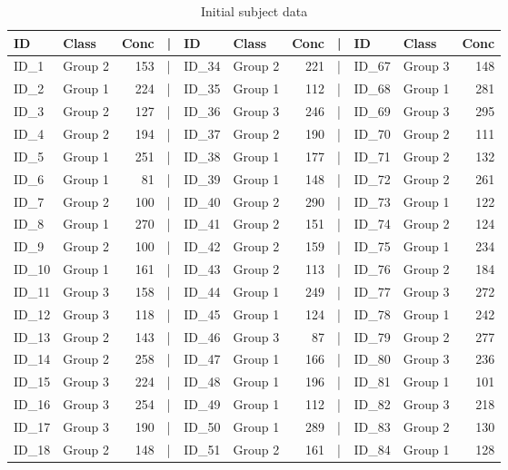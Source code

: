 \documentclass[smallextended]{svjour3}       %
\begin{document}
\newpage

\begin{table}

\caption{\label{tab:show-table-1}Initial subject data}
\centering
\begin{tabular}[t]{llrlllrlllr}
\toprule
ID & Class & Conc & | & ID & Class & Conc & | & ID & Class & Conc\\
\midrule
ID\_1 & Group 2 & 153 & | & ID\_34 & Group 2 & 221 & | & ID\_67 & Group 3 & 148\\
ID\_2 & Group 1 & 224 & | & ID\_35 & Group 1 & 112 & | & ID\_68 & Group 1 & 281\\
ID\_3 & Group 2 & 127 & | & ID\_36 & Group 3 & 246 & | & ID\_69 & Group 3 & 295\\
ID\_4 & Group 2 & 194 & | & ID\_37 & Group 2 & 190 & | & ID\_70 & Group 2 & 111\\
ID\_5 & Group 1 & 251 & | & ID\_38 & Group 1 & 177 & | & ID\_71 & Group 2 & 132\\
\addlinespace
ID\_6 & Group 1 & 81 & | & ID\_39 & Group 1 & 148 & | & ID\_72 & Group 2 & 261\\
ID\_7 & Group 2 & 100 & | & ID\_40 & Group 2 & 290 & | & ID\_73 & Group 1 & 122\\
ID\_8 & Group 1 & 270 & | & ID\_41 & Group 2 & 151 & | & ID\_74 & Group 2 & 124\\
ID\_9 & Group 2 & 100 & | & ID\_42 & Group 2 & 159 & | & ID\_75 & Group 1 & 234\\
ID\_10 & Group 1 & 161 & | & ID\_43 & Group 2 & 113 & | & ID\_76 & Group 2 & 184\\
\addlinespace
ID\_11 & Group 3 & 158 & | & ID\_44 & Group 1 & 249 & | & ID\_77 & Group 3 & 272\\
ID\_12 & Group 3 & 118 & | & ID\_45 & Group 1 & 124 & | & ID\_78 & Group 1 & 242\\
ID\_13 & Group 2 & 143 & | & ID\_46 & Group 3 & 87 & | & ID\_79 & Group 2 & 277\\
ID\_14 & Group 2 & 258 & | & ID\_47 & Group 1 & 166 & | & ID\_80 & Group 3 & 236\\
ID\_15 & Group 3 & 224 & | & ID\_48 & Group 1 & 196 & | & ID\_81 & Group 1 & 101\\
\addlinespace
ID\_16 & Group 3 & 254 & | & ID\_49 & Group 1 & 112 & | & ID\_82 & Group 3 & 218\\
ID\_17 & Group 3 & 190 & | & ID\_50 & Group 1 & 289 & | & ID\_83 & Group 2 & 130\\
ID\_18 & Group 2 & 148 & | & ID\_51 & Group 2 & 161 & | & ID\_84 & Group 1 & 128\\

\end{tabular}
\end{table}
\end{document}
